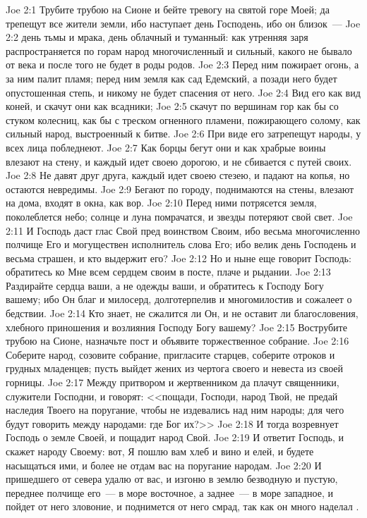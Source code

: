 \vs Joe 2:1 Трубите трубою на Сионе и бейте тревогу на святой горе Моей; да трепещут все жители земли, ибо наступает день Господень, ибо он близок~---
\vs Joe 2:2 день тьмы и мрака, день облачный и туманный: как утренняя заря распространяется по горам народ многочисленный и сильный, какого не бывало от века и после того не будет в роды родов.
\vs Joe 2:3 Перед ним пожирает огонь, а за ним палит пламя; перед ним земля как сад Едемский, а позади него будет опустошенная степь, и никому не будет спасения от него.
\vs Joe 2:4 Вид его как вид коней, и скачут они как всадники;
\vs Joe 2:5 скачут по вершинам гор как бы со стуком колесниц, как бы с треском огненного пламени, пожирающего солому, как сильный народ, выстроенный к битве.
\vs Joe 2:6 При виде его затрепещут народы, у всех лица побледнеют.
\vs Joe 2:7 Как борцы бегут они и как храбрые воины влезают на стену, и каждый идет своею дорогою, и не сбивается с путей своих.
\vs Joe 2:8 Не давят друг друга, каждый идет своею стезею, и падают на копья, но остаются невредимы.
\vs Joe 2:9 Бегают по городу, поднимаются на стены, влезают на дома, входят в окна, как вор.
\vs Joe 2:10 Перед ними потрясется земля, поколеблется небо; солнце и луна помрачатся, и звезды потеряют свой свет.
\vs Joe 2:11 И Господь даст глас Свой пред воинством Своим, ибо весьма многочисленно полчище Его и могуществен исполнитель слова Его; ибо велик день Господень и весьма страшен, и кто выдержит его?
\vs Joe 2:12 Но и ныне еще говорит Господь: обратитесь ко Мне всем сердцем своим в посте, плаче и рыдании.
\vs Joe 2:13 Раздирайте сердца ваши, а не одежды ваши, и обратитесь к Господу Богу вашему; ибо Он благ и милосерд, долготерпелив и многомилостив и сожалеет о бедствии.
\vs Joe 2:14 Кто знает, не сжалится ли Он, и не оставит ли благословения, хлебного приношения и возлияния Господу Богу вашему?
\vs Joe 2:15 Вострубите трубою на Сионе, назначьте пост и объявите торжественное собрание.
\vs Joe 2:16 Соберите народ, созовите собрание, пригласите старцев, соберите отроков и грудных младенцев; пусть выйдет жених из чертога своего и невеста из своей горницы.
\vs Joe 2:17 Между притвором и жертвенником да плачут священники, служители Господни, и говорят: <<пощади, Господи, народ Твой, не предай наследия Твоего на поругание, чтобы не издевались над ним народы; для чего будут говорить между народами: где Бог их?>>
\vs Joe 2:18 И тогда возревнует Господь о земле Своей, и пощадит народ Свой.
\vs Joe 2:19 И ответит Господь, и скажет народу Своему: вот, Я пошлю вам хлеб и вино и елей, и будете насыщаться ими, и более не отдам вас на поругание народам.
\vs Joe 2:20 И пришедшего от севера удалю от вас, и изгоню в землю безводную и пустую, переднее полчище его~--- в море восточное, а заднее~--- в море западное, и пойдет от него зловоние, и поднимется от него смрад, так как он много наделал .
